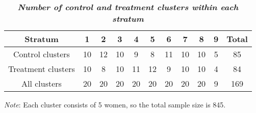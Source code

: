 \documentclass[12pt]{article}
\begin{document}
\begin{table}[ht]
\begin{center}
\caption*{\textit{\textbf{Number of control and treatment clusters within each stratum}}}
\label{table:contingency_table_cell_sizes}
\footnotesize
{}
\begin{tabular}{c|ccccccccc|c} \hline\hline
Stratum & 1  & 2  & 3  & 4  & 5  & 6  & 7  & 8  & 9 & Total \\\hline
Control clusters & 10 & 12 & 10 & 9  & 8  & 11 & 10 & 10 & 5 & 85 \\
Treatment clusters & 10 & 8  & 10 & 11 & 12 & 9  & 10 & 10 & 4 & 84 \\ \hline
All clusters & 20 & 20 & 20 & 20 & 20 & 20 & 20 & 20 & 9 & 169 \\ \hline\hline
\end{tabular}

\vspace{2mm}
\textit{Note}: Each cluster consists of 5 women, so the total sample size is 845.
\end{center}
\end{table}
\vspace{-5mm}
\end{document}
